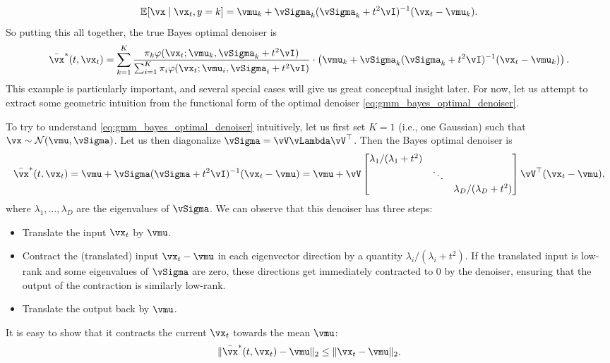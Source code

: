 \documentclass[../../book-main.tex]{subfiles}
\begin{document}
\begin{example}
	\begin{equation}
		\Ex[\vx \mid \vx_{t}, y = k] = \vmu_{k} + \vSigma_{k}(\vSigma_{k} + t^{2}\vI)^{-1}(\vx_{t} - \vmu_{k}).
	\end{equation}
	So putting this all together, the true Bayes optimal denoiser is 
	\begin{equation}\label{eq:gmm_bayes_optimal_denoiser}
		\bar{\vx}^{\ast}(t, \vx_{t}) = \sum_{k = 1}^{K}\frac{\pi_{k}\phi(\vx_{t}
		;\vmu_{k}, \vSigma_{k} + t^{2}\vI)}{\sum_{i = 1}^{K}\pi_{i}\phi(\vx_{t}
		;\vmu_{i}, \vSigma_{i} + t^{2}\vI)}\cdot\bp{\vmu_{k} + \vSigma_{k}(\vSigma_{k} + t^{2}\vI)^{-1}(\vx_{t} - \vmu_{k})}.
	\end{equation}
	This example is particularly important, and several special cases will give us great conceptual insight later. For now, let us attempt to extract some geometric intuition from the functional form of the optimal denoiser \eqref{eq:gmm_bayes_optimal_denoiser}.

	To try to understand \eqref{eq:gmm_bayes_optimal_denoiser} intuitively, let us first set \(K = 1\) (i.e., one Gaussian) such that \(\vx \sim \dNorm(\vmu, \vSigma)\). Let us then diagonalize \(\vSigma = \vV\vLambda \vV^{\top}\). Then the Bayes optimal denoiser is 
	\begin{equation}
		\bar{\vx}^{\ast}(t, \vx_{t}) = \vmu + \vSigma(\vSigma + t^{2}\vI)^{-1}(\vx_{t} - \vmu) = \vmu + \vV\mat{\lambda_{1}/(\lambda_{1} + t^{2}) & & \\ & \ddots & \\ & & \lambda_{D}/(\lambda_{D} + t^{2})}\vV^{\top}(\vx_{t} - \vmu),
	\end{equation}
	where \(\lambda_{1}, \dots, \lambda_{D}\) are the eigenvalues of \(\vSigma\). We can observe that this denoiser has three steps:
	\begin{itemize}
		\item Translate the input \(\vx_{t}\) by \(\vmu\).
		\item Contract the (translated) input \(\vx_{t} - \vmu\) in each eigenvector direction by a quantity \(\lambda_{i}/(\lambda_{i} + t^{2})\). If the translated input is low-rank and some eigenvalues of \(\vSigma\) are zero, these directions get immediately contracted to \(0\) by the denoiser, ensuring that the output of the contraction is similarly low-rank.
		\item Translate the output back by \(\vmu\).
	\end{itemize}
	It is easy to show that it contracts the current \(\vx_{t}\) towards the mean \(\vmu\):
	\begin{equation}\label{eq:contraction}
		\norm{\bar{\vx}^{\ast}(t, \vx_{t}) - \vmu}_{2} \leq \norm{\vx_{t} - \vmu}_{2}.
	\end{equation}


\end{example}
\end{document}
